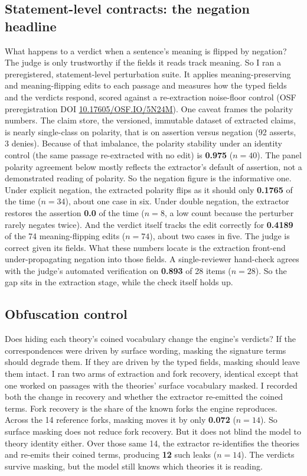 \documentclass[11pt]{article}
\begin{document}
\subsection{Statement-level contracts: the negation headline}
What happens to a verdict when a sentence's meaning is flipped by negation? The judge is only trustworthy
if the fields it reads track meaning. So I ran a preregistered, statement-level perturbation suite. It
applies meaning-preserving and meaning-flipping edits to each passage and measures how the typed fields and
the verdicts respond, scored against a re-extraction noise-floor control (OSF preregistration DOI
\href{https://doi.org/10.17605/OSF.IO/5N24M}{10.17605/OSF.IO/5N24M}). One caveat frames the polarity
numbers. The claim store, the versioned, immutable dataset of extracted claims, is nearly single-class on
polarity, that is on assertion versus negation (92 asserts, 3 denies). Because of that imbalance, the
polarity stability under an identity control (the same passage re-extracted with no edit) is \textbf{0.975}
($n = 40$). The panel polarity agreement below mostly reflects the extractor's default of assertion, not a
demonstrated reading of polarity. So the negation figure is the informative one. Under explicit negation,
the extracted polarity flips as it should only \textbf{0.1765} of the time ($n = 34$), about one case in
six. Under double
negation, the extractor restores the assertion \textbf{0.0} of the time ($n = 8$, a low count because the
perturber rarely negates twice). And the verdict itself tracks the edit correctly for \textbf{0.4189} of
the 74 meaning-flipping edits ($n = 74$), about two cases in five. The judge is correct given its fields.
What these numbers locate
is the extraction front-end under-propagating negation into those fields. A single-reviewer hand-check
agrees with the judge's automated verification on \textbf{0.893} of 28 items ($n = 28$). So the gap sits in
the extraction stage, while the check itself holds up.

\subsection{Obfuscation control}
Does hiding each theory's coined vocabulary change the engine's verdicts? If the correspondences were
driven by surface wording, masking the signature terms should degrade them. If they are driven by the typed
fields, masking should leave them intact. I ran two arms of extraction and fork recovery, identical except
that one worked on passages with the theories' surface vocabulary masked. I recorded both the change in
recovery and whether the extractor re-emitted the coined terms. Fork recovery is the share of the known
forks the engine reproduces. Across the 14 reference forks, masking moves it by only \textbf{0.072}
($n = 14$). So surface masking does not reduce fork recovery. But it does not blind the model to theory
identity either. Over those same 14, the extractor re-identifies the theories and re-emits their coined
terms, producing \textbf{12} such leaks ($n = 14$). The verdicts survive masking, but the model still knows
which theories it is reading.
\end{document}
